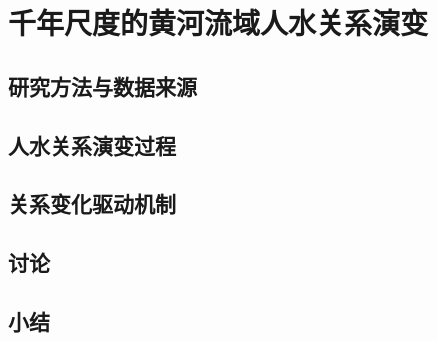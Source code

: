 \chapter{千年尺度的黄河流域人水关系演变}\label{cha:3}


\section{研究方法与数据来源}\label{ch3:methods}



\section{人水关系演变过程}\label{ch3:process}


\section{关系变化驱动机制}\label{ch3:mechanism}


\section{讨论}\label{ch3:discussion}



\section{小结}\label{ch3:summary}

